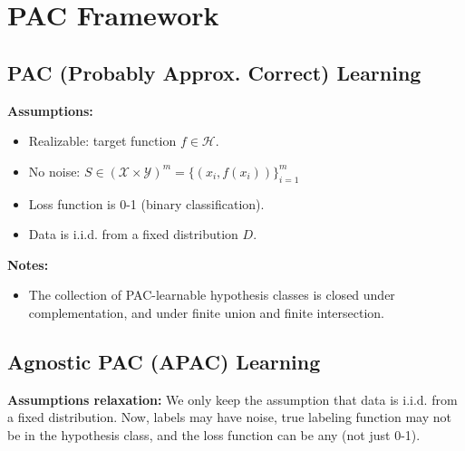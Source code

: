 \section{PAC Framework}

\subsection{PAC (Probably Approx. Correct) Learning}
\textbf{Assumptions:}
\begin{itemize}
    \item Realizable: target function $f\in \mathcal{H}$.
    \item No noise: $S \in (\mathcal{X} \times \mathcal{Y})^m = \{(x_i, f(x_i))\}_{i=1}^m$
    \item Loss function is 0-1 (binary classification).
    \item Data is i.i.d. from a fixed distribution $D$.
\end{itemize}


\textbf{Notes:}
\begin{itemize}
    \item The collection of PAC-learnable hypothesis classes is closed under complementation, and under finite union and finite intersection.
\end{itemize}

\subsection{Agnostic PAC (APAC) Learning}
\textbf{Assumptions relaxation:} We only keep the assumption that data is i.i.d. from a fixed distribution. Now, labels may have noise, true labeling function may not be in the hypothesis class, and the loss function can be any (not just 0-1).



